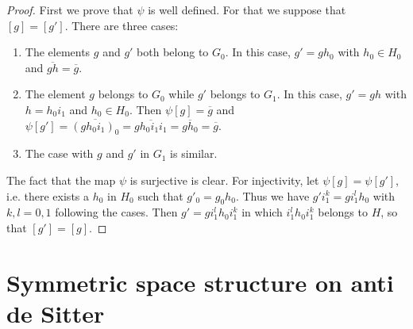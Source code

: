 \begin{proof}
First we prove that $\psi$ is well defined. For that we suppose that $[g]=[g']$. There are three cases:
\begin{enumerate}
\item The elements $g$ and $g'$ both belong to $G_0$. In this case, $g'=gh_0$ with $h_0\in H_0$ and $\overline{ gh }=\overline{ g }$.
\item The element $g$ belongs to $G_0$ while $g'$ belongs to $G_1$. In this case, $g'=gh$ with $h=h_0i_1$ and $h_0\in H_0$. Then $\psi[g]=\overline{ g }$ and $\psi[g']= \overline{ (gh_0i_1)_0 }=\overline{ gh_0i_1i_1 }=\overline{ gh_0 }=\overline{ g } $.
\item The case with $g$ and $g'$ in $G_1$ is similar.
\end{enumerate}

The fact that the map $\psi$ is surjective is clear. For injectivity, let $\psi[g]=\psi[g']$, i.e. there exists a $h_0$ in $H_0$ such that $g'_0=g_0h_0$. Thus we have $g'i_1^k=gi_1^lh_0$ with $k,l=0,1$ following the cases. Then $g'=gi_1^lh_0i_1^k$ in which $i_1^lh_0i_1^k$ belongs to $H$, so that $[g']=[g]$.

\end{proof}


\section{Symmetric space structure on anti de Sitter}\label{SecSymeStructAdS}

